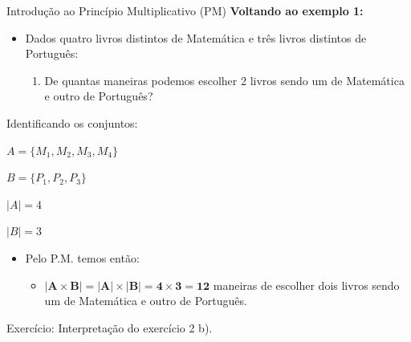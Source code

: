 \documentclass[aspectratio=169]{beamer}
\begin{document}
\begin{frame}{Introdução ao Princípio Multiplicativo (PM)}
    \textbf{Voltando ao exemplo 1:}

    \vspace{4mm}
    \begin{itemize}
        \item Dados quatro livros distintos de Matemática e três livros distintos de Português:
        \begin{enumerate}[b]
            \item De quantas maneiras podemos escolher 2 livros sendo um de Matemática e outro de Português?
        \end{enumerate}
    \end{itemize}

    \vspace{2mm}
    Identificando os conjuntos:
    \begin{center}
        \begin{multicols}{2}
            $A = \{M_{1}, M_{2}, M_{3}, M_{4}\}$
            
            \columnbreak
    
            $B = \{P_{1}, P_{2}, P_{3}\}$    
        \end{multicols}
    \end{center}


    \begin{center}
        \begin{multicols}{2}
            $|A| = 4$ 

            \columnbreak

            $|B| = 3$
        \end{multicols}
    \end{center}

    \begin{itemize}
        \item Pelo P.M. temos então:
        \begin{itemize}
            \item[] $\boldsymbol{|A \times B| = |A| \times |B| = 4 \times 3 = 12}$ maneiras de escolher dois livros sendo um de Matemática e outro de Português.
        \end{itemize}
    \end{itemize}

    \vspace{2mm}
    Exercício: Interpretação do exercício 2 b).

\end{frame}
\end{document}
